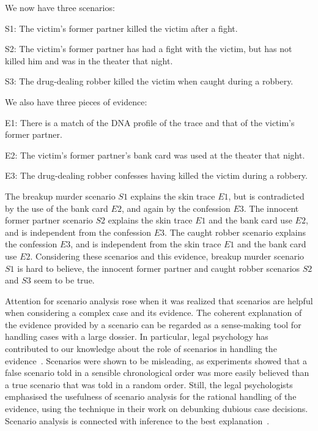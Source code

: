 \documentclass[10pt]{article}
\begin{document}
We now have three scenarios:

\begin{description}
	\item S1: The victim's former partner killed the victim after a fight.
	\item S2: The victim's former partner has had a fight with the victim, but has not killed him and was in the theater that night.
	\item S3: The drug-dealing robber killed the victim when caught during a robbery.	
\end{description}

We also have three pieces of evidence:

\begin{description}
	\item E1: There is a match of the DNA profile of the trace and that of the victim's former partner.
	\item E2: The victim's former partner's bank card was used at the theater that night.
	\item E3: The drug-dealing robber confesses having killed the victim during a robbery.	
\end{description}

\noindent The breakup murder scenario $S1$ explains the skin trace $E1$, but is contradicted by the use of the bank card $E2$, and again by the confession $E3$. The innocent former partner scenario $S2$ explains the skin trace $E1$ and the bank card use $E2$, and is independent from the confession $E3$. The caught robber scenario explains the confession $E3$, and is independent from the skin trace $E1$ and the bank card use $E2$. Considering these scenarios and this evidence, breakup murder scenario $S1$ is hard to believe, the innocent former partner and caught robber scenarios $S2$ and $S3$ seem to be true.

Attention for scenario analysis rose when it was realized that scenarios are helpful when considering a complex case and its evidence. The coherent explanation of the evidence provided by a scenario can be regarded as a sense-making tool for handling cases with a large dossier. In particular, legal psychology has contributed to our knowledge about the role of scenarios in handling the evidence~\citep{bennettFeldman1981,penningtonHastie1993}. Scenarios were shown to be misleading, as experiments showed that a false scenario told in a sensible chronological order was more easily believed than a true scenario that was told in a random order. Still, the legal psychologists~\citet{wagenaarEtal1993} emphasised the usefulness of scenario analysis for the rational handling of the evidence, using the technique in their work on debunking dubious case decisions. Scenario analysis is connected with inference to the best explanation~\citep{pardoAllen2008}.
\end{document}
